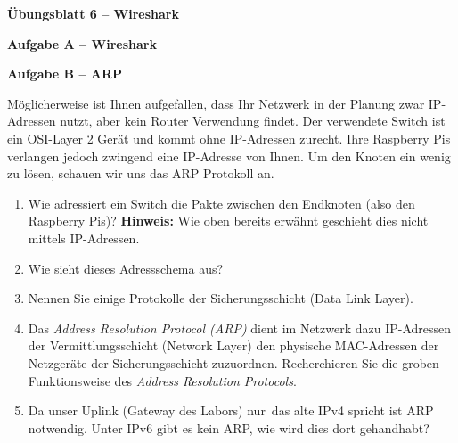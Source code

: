 \documentclass[paper=a4,fontsize=11pt]{scrartcl}%
\numberwithin{equation}{section}
\begin{document}
\begin{center}
\Large{\textbf{Übungsblatt 6 -- Wireshark}}
\end{center}
\begin{center}\Large{\textbf{Aufgabe A -- Wireshark}}\end{center}\vskip0.25in

\begin{center}\Large{\textbf{Aufgabe B -- ARP}}\end{center}\vskip0.25in
Möglicherweise ist Ihnen aufgefallen, dass Ihr Netzwerk in der Planung zwar IP-Adressen nutzt, aber kein Router Verwendung findet. Der verwendete Switch ist ein OSI-Layer 2 Gerät und kommt ohne IP-Adressen zurecht. Ihre Raspberry Pis verlangen jedoch zwingend eine IP-Adresse von Ihnen. Um den Knoten ein wenig zu lösen, schauen wir uns das ARP Protokoll an. 
\begin{enumerate}
		\item Wie adressiert ein Switch die Pakte zwischen den Endknoten (also den Raspberry Pis)? \textbf{Hinweis:} Wie oben bereits erwähnt geschieht dies nicht mittels IP-Adressen.
		\item Wie sieht dieses Adressschema aus?
		\item Nennen Sie einige Protokolle der Sicherungsschicht (Data Link Layer).
		\item Das \emph{Address Resolution Protocol (ARP)} dient im Netzwerk dazu IP-Adressen der Vermittlungsschicht (Network Layer) den physische MAC-Adressen der Netzgeräte der Sicherungsschicht zuzuordnen. Recherchieren Sie die groben Funktionsweise des \emph{Address Resolution Protocols}.
		\item Da unser Uplink (Gateway des Labors) \glqq nur\grqq\ das alte IPv4 spricht ist ARP notwendig. Unter IPv6 gibt es kein ARP, wie wird dies dort gehandhabt?
\end{enumerate}
\end{document}
